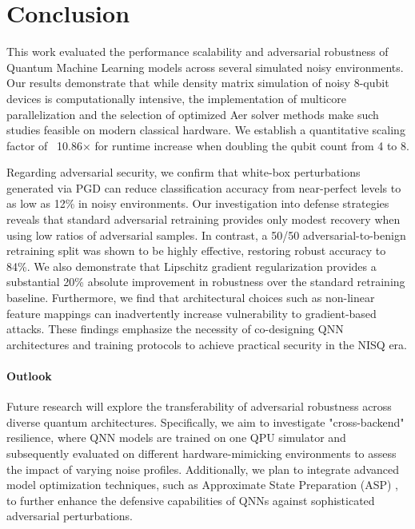 \section{Conclusion}

This work evaluated the performance scalability and adversarial robustness of Quantum Machine Learning models across several simulated noisy environments. Our results demonstrate that while density matrix simulation of noisy 8-qubit devices is computationally intensive, the implementation of multicore parallelization and the selection of optimized Aer solver methods make such studies feasible on modern classical hardware. We establish a quantitative scaling factor of ~10.86× for runtime increase when doubling the qubit count from 4 to 8.

Regarding adversarial security, we confirm that white-box perturbations generated via PGD can reduce classification accuracy from near-perfect levels to as low as 12\% in noisy environments. Our investigation into defense strategies reveals that standard adversarial retraining provides only modest recovery when using low ratios of adversarial samples. In contrast, a 50/50 adversarial-to-benign retraining split was shown to be highly effective, restoring robust accuracy to 84\%. We also demonstrate that Lipschitz gradient regularization provides a substantial 20\% absolute improvement in robustness over the standard retraining baseline. Furthermore, we find that architectural choices such as non-linear feature mappings can inadvertently increase vulnerability to gradient-based attacks. These findings emphasize the necessity of co-designing QNN architectures and training protocols to achieve practical security in the NISQ era.

\paragraph{Outlook}
Future research will explore the transferability of adversarial robustness across diverse quantum architectures. Specifically, we aim to investigate "cross-backend" resilience, where QNN models are trained on one QPU simulator and subsequently evaluated on different hardware-mimicking environments to assess the impact of varying noise profiles. Additionally, we plan to integrate advanced model optimization techniques, such as Approximate State Preparation (ASP) \cite{West2023}, to further enhance the defensive capabilities of QNNs against sophisticated adversarial perturbations.
